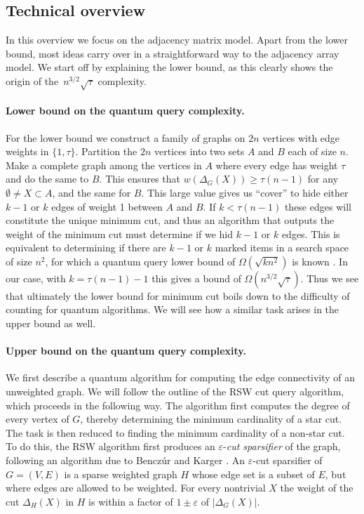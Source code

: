 \subsection{Technical overview}
In this overview we focus on the adjacency matrix model.
Apart from the lower bound, most ideas carry over in a straightforward way to the adjacency array model.  
We start off by explaining the lower bound, as this clearly shows the origin of the~$n^{3/2} \sqrt{\tau}$ complexity.  

\paragraph*{Lower bound on the quantum query complexity.}
For the lower bound we construct a family of graphs on $2n$ vertices with edge weights in $\{1,\tau\}$.  Partition the $2n$ vertices into two sets $A$ and $B$ each of size $n$.  Make 
a complete graph among the vertices in $A$ where every edge has weight $\tau$ and do the same to $B$.  This ensures that $w(\Delta_G(X)) \ge \tau (n-1)$ for any $\emptyset \ne X \subset A$, 
and the same for $B$.  This large value gives us ``cover'' to hide either $k-1$ or $k$ edges of weight 1 between $A$ and $B$.  If $k < \tau(n-1)$ these edges will 
constitute the unique minimum cut, and thus an algorithm that outputs the weight of the minimum cut must determine if we hid $k-1$ or $k$ edges.  This is equivalent to 
determining if there are $k-1$ or $k$ marked items in a search space of size $n^2$, for which a quantum query lower bound of $\Omega(\sqrt{kn^2})$ is known \cite{NW99}.  In our case, with $k = \tau (n-1) -1$ 
this gives a bound of $\Omega(n^{3/2}\sqrt{\tau})$.  Thus we see that ultimately the lower bound for minimum cut boils down to the difficulty of counting for quantum algorithms.  
We will see how a similar task arises in the upper bound as well.  

\paragraph*{Upper bound on the quantum query complexity.}
We first describe a quantum algorithm for computing the edge connectivity of an unweighted graph.  We will follow the outline of the 
RSW cut query algorithm, which proceeds in the following way.  The algorithm first computes the degree of every vertex of $G$, thereby determining the minimum cardinality of a star cut.  The task is then reduced to finding 
the minimum cardinality of a non-star cut.  To do this, the RSW algorithm first produces an $\varepsilon$-\emph{cut sparsifier} of the graph, following an algorithm due to 
Bencz\'{u}r and Karger \cite{BK15}.  An $\varepsilon$-cut sparsifier of $G = (V,E)$ is a sparse weighted graph $H$ whose edge set is a subset of $E$, but where edges 
are allowed to be weighted.  For every nontrivial $X$ the weight of the cut $\Delta_H(X)$ in $H$ is within a factor of $1 \pm \varepsilon$ of $|\Delta_G(X)|$.  

